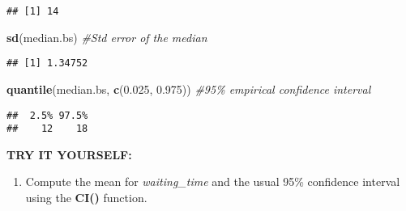 \documentclass[
]{book}
\newenvironment{Shaded}{\begin{snugshade}}{\end{snugshade}}
\newcommand{\AttributeTok}[1]{\textcolor[rgb]{0.13,0.29,0.53}{#1}}
\newcommand{\CommentTok}[1]{\textcolor[rgb]{0.56,0.35,0.01}{\textit{#1}}}
\newcommand{\ConstantTok}[1]{\textcolor[rgb]{0.56,0.35,0.01}{#1}}
\newcommand{\ControlFlowTok}[1]{\textcolor[rgb]{0.13,0.29,0.53}{\textbf{#1}}}
\newcommand{\DecValTok}[1]{\textcolor[rgb]{0.00,0.00,0.81}{#1}}
\newcommand{\FloatTok}[1]{\textcolor[rgb]{0.00,0.00,0.81}{#1}}
\newcommand{\FunctionTok}[1]{\textcolor[rgb]{0.13,0.29,0.53}{\textbf{#1}}}
\newcommand{\NormalTok}[1]{#1}
\newcommand{\OtherTok}[1]{\textcolor[rgb]{0.56,0.35,0.01}{#1}}
\newcommand{\SpecialCharTok}[1]{\textcolor[rgb]{0.81,0.36,0.00}{\textbf{#1}}}
\providecommand{\tightlist}{%
  \setlength{\itemsep}{0pt}\setlength{\parskip}{0pt}}
\begin{document}
\begin{Shaded}
\end{Shaded}

\begin{verbatim}
## [1] 14
\end{verbatim}

\begin{Shaded}
\begin{Highlighting}[]
\FunctionTok{sd}\NormalTok{(median.bs)      }\CommentTok{\#Std error of the median}
\end{Highlighting}
\end{Shaded}

\begin{verbatim}
## [1] 1.34752
\end{verbatim}

\begin{Shaded}
\begin{Highlighting}[]
\FunctionTok{quantile}\NormalTok{(median.bs, }\FunctionTok{c}\NormalTok{(}\FloatTok{0.025}\NormalTok{, }\FloatTok{0.975}\NormalTok{))  }\CommentTok{\#95\% empirical confidence interval}
\end{Highlighting}
\end{Shaded}

\begin{verbatim}
##  2.5% 97.5% 
##    12    18
\end{verbatim}

\textbf{TRY IT YOURSELF:}

\begin{enumerate}
\def\labelenumi{\arabic{enumi})}
\tightlist
\item
  Compute the mean for \emph{waiting\_time} and the usual 95\% confidence
  interval using the \textbf{CI()} function.
\end{enumerate}
\end{document}
